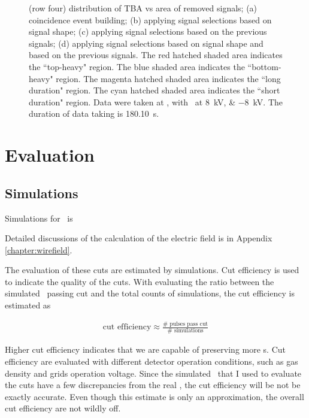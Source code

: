 \begin{landscape}
\begin{figure}[!p]
{			(row four) distribution of TBA vs area of removed signals;
			(a) coincidence event building; 
			(b) applying signal selections based on signal shape;
			(c) applying signal selections based on the previous signals;
			(d) applying signal selections based on signal shape and based on the previous signals.
			The red hatched shaded area indicates the ``top-heavy" region.
			The blue shaded area indicates the ``bottom-heavy" region.
			The magenta hatched shaded area indicates the ``long duration" region.
			The cyan hatched shaded area indicates the ``short duration" region.
			Data were taken at , with \opvtvb\ at \SIlist{+8;-8}{kV}. The duration of data taking is \SI{180.10}{\s}.
		}
		\label{fig:signal selection dv 16}
	\end{figure}
\end{landscape}

\section{Evaluation}
\subsection{Simulations}
Simulations for \ees\ is

Detailed discussions of the calculation of the electric field is in Appendix \ref{chapter:wirefield}.


The evaluation of these cuts are estimated by simulations. Cut efficiency is used to indicate the quality of the cuts. With evaluating the ratio between the simulated \ees\ passing cut and the total counts of simulations, the cut efficiency is estimated as 

\begin{align}
 \text{cut efficiency} \approx \frac{\text{\#\  pulses pass cut}}{\text{\#\  simulations}}
\end{align} 

Higher cut efficiency indicates that we are capable of preserving more \ees s. Cut efficiency are evaluated with different detector operation conditions, such as gas density and grids operation voltage. Since the simulated \ees\ that I used to evaluate the cuts have a few discrepancies from the real \ees, the cut efficiency will be not be exactly accurate. Even though this estimate is only an approximation, the overall cut efficiency are not wildly off.

